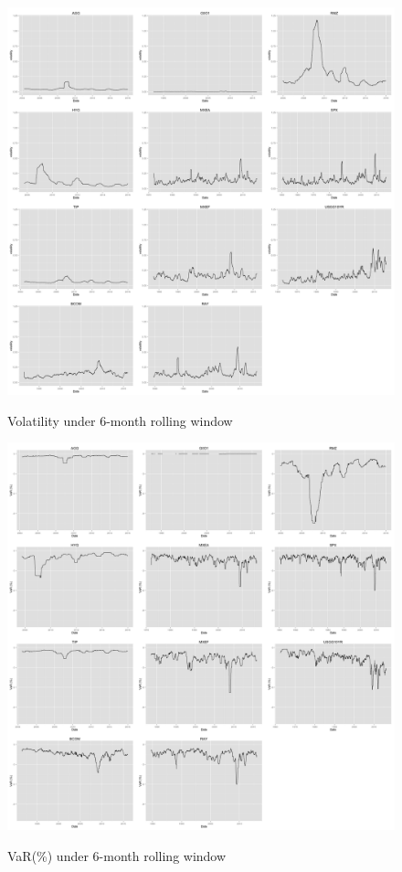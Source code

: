 \documentclass[12pt]{article}
\begin{document}
\begin{figure}[h]
\caption{Volatility under 6-month rolling window} 
\centering 
\includegraphics[width=15cm]{../results/volatility6mon}
\label{fig: variance6mon}
\end{figure}

\begin{figure}[h]
\caption{VaR(\%) under 6-month rolling window}
\centering 
\includegraphics[width=15cm]{../results/VaR6mon_scaled}
\label{fig: VaR6mon}
\end{figure}
\end{document}
